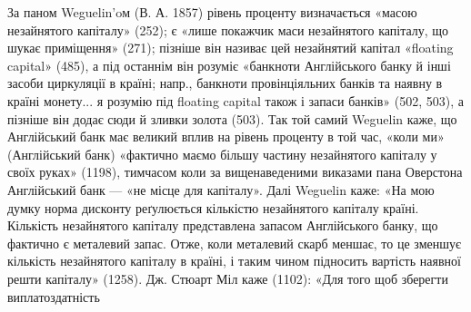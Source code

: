 За паном Weguelin’oм (В. А. 1857) рівень проценту визначається «масою
незайнятого капіталу» (252); є «лише покажчик маси незайнятого капіталу, що
шукає приміщення» (271); пізніше він називає цей незайнятий капітал «floating
capital» (485), а під останнім він розуміє «банкноти Англійського банку й інші
засоби циркуляції в країні; напр., банкноти провінціяльних банків та наявну в
країні монету... я розумію під floating capital також і запаси банків» (502, 503),
а пізніше він додає сюди й зливки золота (503). Так той самий Weguelin каже, що
Англійський банк має великий вплив на рівень проценту в той час, «коли ми» (Англійський
банк) «фактично маємо більшу частину незайнятого капіталу у своїх
руках» (1198), тимчасом коли за вищенаведеними виказами пана Оверстона Англійський
банк — «не місце для капіталу». Далі Weguelin каже: «На мою думку
норма дисконту реґулюється кількістю незайнятого капіталу країні. Кількість незайнятого
капіталу представлена запасом Англійського банку, що фактично є металевий
запас. Отже, коли металевий скарб меншає, то це зменшує кількість незайнятого
капіталу в країні, і таким чином підносить вартість наявної решти капіталу»
(1258). Дж. Стюарт Міл каже (1102): «Для того щоб зберегти виплатоздатність
